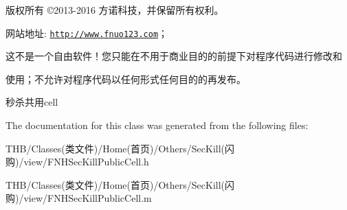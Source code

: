 版权所有 ©2013-\/2016 方诺科技，并保留所有权利。

网站地址\+: \href{http://www.fnuo123.com}{\tt http\+://www.\+fnuo123.\+com}； 



这不是一个自由软件！您只能在不用于商业目的的前提下对程序代码进行修改和

使用；不允许对程序代码以任何形式任何目的的再发布。 



秒杀共用cell 

The documentation for this class was generated from the following files\+:\begin{DoxyCompactItemize}
\item 
T\+H\+B/\+Classes(类文件)/\+Home(首页)/\+Others/\+Sec\+Kill(闪购)/view/F\+N\+H\+Sec\+Kill\+Public\+Cell.\+h\item 
T\+H\+B/\+Classes(类文件)/\+Home(首页)/\+Others/\+Sec\+Kill(闪购)/view/F\+N\+H\+Sec\+Kill\+Public\+Cell.\+m\end{DoxyCompactItemize}
